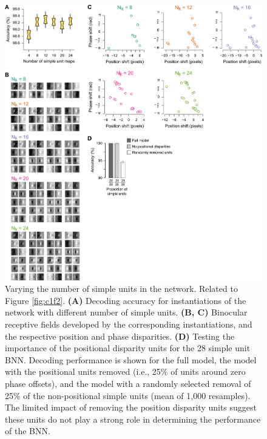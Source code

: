 \begin{figure}[!h]
  \centering
  \includegraphics[width=14cm,keepaspectratio]{FigS2.png}
  \caption[Varying the number of simple units in the network.]{Varying the number of simple units in the network. Related to Figure \ref{fig:c1f2}. \textbf{(A)} Decoding accuracy for instantiations of the network with different number of simple units. \textbf{(B, C)} Binocular receptive fields developed by the corresponding instantiations, and the respective position and phase disparities. \textbf{(D)} Testing the importance of the positional disparity units for the 28 simple unit BNN. Decoding performance is shown for the full model, the model with the positional units removed (i.e., 25\% of units around zero phase offsets), and the model with a randomly selected removal of 25\% of the non-positional simple units (mean of 1,000 resamples). The limited impact of removing the position disparity units suggest these units do not play a strong role in determining the performance of the BNN.}
  \label{fig:c1fs2}
\end{figure}

